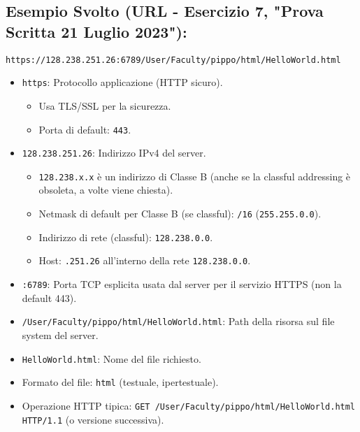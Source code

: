 \subsection{Esempio Svolto (URL - Esercizio 7, "Prova Scritta 21 Luglio 2023"):}
\texttt{https://128.238.251.26:6789/User/Faculty/pippo/html/HelloWorld.html}
\begin{itemize}
    \item \texttt{https}: Protocollo applicazione (HTTP sicuro).
    \begin{itemize}
        \item Usa TLS/SSL per la sicurezza.
        \item Porta di default: \texttt{443}.
    \end{itemize}
    \item \texttt{128.238.251.26}: Indirizzo IPv4 del server.
    \begin{itemize}
        \item \texttt{128.238.x.x} è un indirizzo di Classe B (anche se la classful addressing è obsoleta, a volte viene chiesta).
        \item Netmask di default per Classe B (se classful): \texttt{/16} (\texttt{255.255.0.0}).
        \item Indirizzo di rete (classful): \texttt{128.238.0.0}.
        \item Host: \texttt{.251.26} all'interno della rete \texttt{128.238.0.0}.
    \end{itemize}
    \item \texttt{:6789}: Porta TCP esplicita usata dal server per il servizio HTTPS (non la default 443).
    \item \texttt{/User/Faculty/pippo/html/HelloWorld.html}: Path della risorsa sul file system del server.
    \item \texttt{HelloWorld.html}: Nome del file richiesto.
    \item Formato del file: \texttt{html} (testuale, ipertestuale).
    \item Operazione HTTP tipica: \texttt{GET /User/Faculty/pippo/html/HelloWorld.html HTTP/1.1} (o versione successiva).
\end{itemize}

